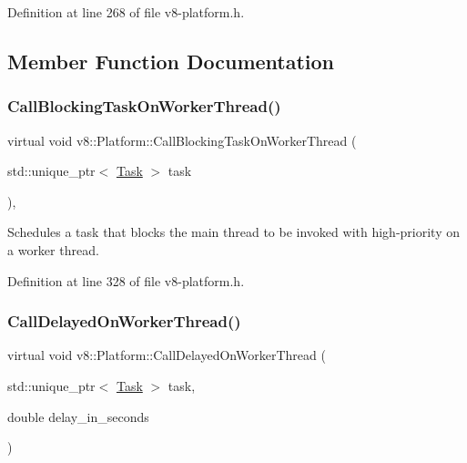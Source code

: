 Definition at line 268 of file v8-\/platform.\+h.



\subsection{Member Function Documentation}
\mbox{\label{classv8_1_1Platform_ada31b440048763bf8d9c296ca4cf2e1b}} 
\subsubsection{\texorpdfstring{Call\+Blocking\+Task\+On\+Worker\+Thread()}{CallBlockingTaskOnWorkerThread()}}
{\footnotesize\ttfamily virtual void v8\+::\+Platform\+::\+Call\+Blocking\+Task\+On\+Worker\+Thread (\begin{DoxyParamCaption}\item[{std\+::unique\+\_\+ptr$<$ \mbox{\hyperlink{classv8_1_1Task}{Task}} $>$}]{task }\end{DoxyParamCaption})\hspace{0.3cm}{\ttfamily [inline]}, {\ttfamily [virtual]}}

Schedules a task that blocks the main thread to be invoked with high-\/priority on a worker thread. 

Definition at line 328 of file v8-\/platform.\+h.

\mbox{\label{classv8_1_1Platform_a808b0e55ed3efca10ebca031bbd6ecc6}} 
\subsubsection{\texorpdfstring{Call\+Delayed\+On\+Worker\+Thread()}{CallDelayedOnWorkerThread()}}
{\footnotesize\ttfamily virtual void v8\+::\+Platform\+::\+Call\+Delayed\+On\+Worker\+Thread (\begin{DoxyParamCaption}\item[{std\+::unique\+\_\+ptr$<$ \mbox{\hyperlink{classv8_1_1Task}{Task}} $>$}]{task,  }\item[{double}]{delay\+\_\+in\+\_\+seconds }\end{DoxyParamCaption})\hspace{0.3cm}{\ttfamily [pure virtual]}}

